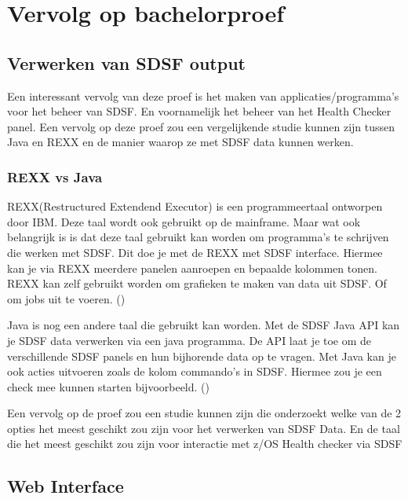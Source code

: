 \chapter{Vervolg op bachelorproef}
\label{ch:Vervolg op bachelorproef}

\section{Verwerken van SDSF output}
\label{sec:Verwerken van SDSF output}

Een interessant vervolg van deze proef is het maken van applicaties/programma's voor het beheer van SDSF. En voornamelijk het beheer van het Health Checker panel. Een vervolg op deze proef zou een vergelijkende studie kunnen zijn tussen Java en REXX en de manier waarop ze met SDSF data kunnen werken.

\subsection{REXX vs Java}
\label{subsec:REXX vs Java}



REXX(Restructured Extendend Executor) is een programmeertaal ontworpen door IBM. Deze taal wordt ook gebruikt op de mainframe. Maar wat ook belangrijk is is dat deze taal gebruikt kan worden om programma's te schrijven die werken met SDSF. Dit doe je met de REXX met SDSF interface. Hiermee kan je via REXX meerdere panelen aanroepen en bepaalde kolommen tonen. REXX kan zelf gebruikt worden om grafieken te maken van data uit SDSF. Of om jobs uit te voeren. (\cite{Parziale2007})

Java is nog een andere taal die gebruikt kan worden. Met de SDSF Java API kan je SDSF data verwerken via een java programma. De API laat je toe om de verschillende SDSF panels en hun bijhorende data op te vragen. Met Java kan je ook acties uitvoeren zoals de kolom commando's in SDSF. Hiermee zou je een check mee kunnen starten bijvoorbeeld. (\cite{Wood2012})

Een vervolg op de proef zou een studie kunnen zijn die onderzoekt welke van de 2 opties het meest geschikt zou zijn voor het verwerken van SDSF Data. En de taal die het meest geschikt zou zijn voor interactie met z/OS Health checker via SDSF



\section{Web Interface}
\label{sec:Web interface}

